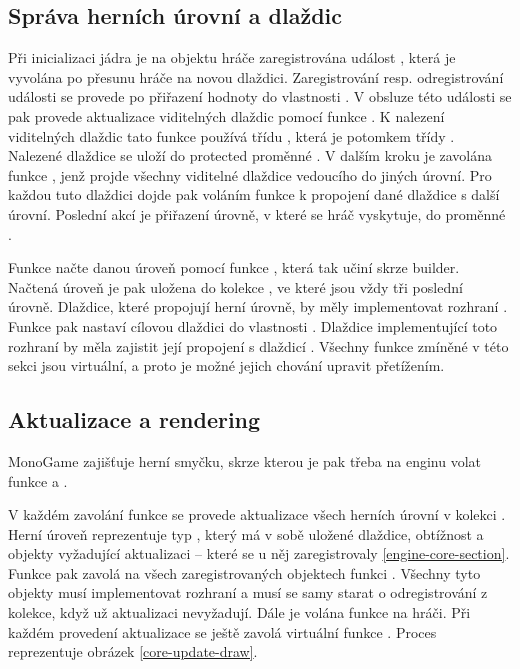 \subsection{Správa herních úrovní a dlaždic}\label{engine-level-management}
Při inicializaci jádra je na objektu hráče zaregistrována událost , která
je vyvolána po přesunu hráče na novou dlaždici. Zaregistrování resp. odregistrování události se provede po
přiřazení hodnoty do vlastnosti . V obsluze této události se pak provede aktualizace
viditelných dlaždic pomocí funkce  . K nalezení viditelných dlaždic tato funkce používá
třídu , která je potomkem třídy . Nalezené dlaždice se
uloží do protected proměnné . V dalším kroku je zavolána funkce 
, jenž projde všechny viditelné dlaždice vedoucího do jiných úrovní. Pro
každou tuto dlaždici dojde pak voláním funkce  k propojení dané dlaždice s další
úrovní. Poslední akcí je přiřazení úrovně, v které se hráč vyskytuje, do proměnné .

Funkce  načte danou úroveň pomocí funkce , která tak učiní skrze builder.
Načtená úroveň je pak uložena do kolekce , ve které jsou vždy tři poslední úrovně.
Dlaždice, které propojují herní úrovně, by měly implementovat rozhraní .
Funkce  pak nastaví cílovou dlaždici do vlastnosti .
Dlaždice implementující toto rozhraní by měla zajistit její propojení s dlaždicí .
Všechny funkce zmíněné v této sekci jsou virtuální, a proto je možné jejich chování upravit přetížením.


\subsection{Aktualizace a rendering}
MonoGame zajišťuje herní smyčku, skrze kterou je pak třeba na enginu volat funkce  a .

V každém zavolání funkce  se provede aktualizace všech herních úrovní v kolekci .
Herní úroveň reprezentuje typ , který má v sobě uložené dlaždice, obtížnost a objekty vyžadující
aktualizaci -- které se u něj zaregistrovaly \vref{engine-core-section}. Funkce  pak 
zavolá na všech zaregistrovaných objektech  funkci . Všechny tyto objekty musí implementovat
rozhraní  a musí se samy starat o odregistrování z kolekce, když už aktualizaci nevyžadují. Dále je volána 
funkce  na hráči. Při každém provedení aktualizace se ještě zavolá virtuální funkce 
. Proces reprezentuje obrázek \ref{core-update-draw}.

